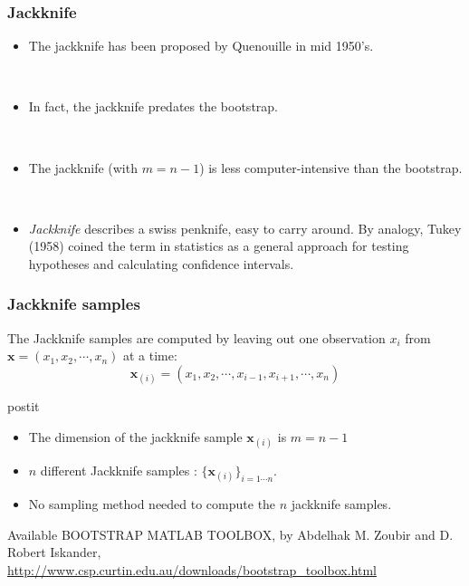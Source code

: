 \frame
{
\frametitle{Jackknife}

\begin{itemize}
\item  The jackknife has been proposed by Quenouille in mid 1950's.

\

\item In fact, the jackknife predates the bootstrap. 

\

\item The jackknife (with $m=n-1$) is less computer-intensive than the bootstrap. 

\

\item \textit{Jackknife} describes a swiss penknife, easy to carry around. By analogy, Tukey (1958) coined the term in statistics as a general approach for testing hypotheses and calculating confidence intervals.  


\end{itemize}

}
\frame
{
\frametitle{Jackknife samples}

\begin{definition}
The \alert{Jackknife samples} are computed by leaving out one observation $x_i$ from $\mathbf{x}=(x_{1},x_{2},\cdots,x_{n})$ at a time:
$$
\mathbf{x}_{(i)}=(x_{1},x_{2},\cdots,x_{i-1},x_{i+1},\cdots,x_{n})
$$ 
\end{definition}

\begin{beamercolorbox}[wd=\linewidth, rounded=true,shadow=true]{postit}
\begin{itemize}
\item The dimension of the jackknife sample $\mathbf{x}_{(i)}$ is $m=n-1$  
\item $n$  different Jackknife samples :  $\lbrace\mathbf{x}_{(i)}\rbrace_{i=1\cdots n}$.
\item No sampling method needed to compute the $n$  jackknife samples.

\end{itemize}
\end{beamercolorbox}
\begin{block}{}
\tiny{Available BOOTSTRAP MATLAB TOOLBOX, by Abdelhak M. Zoubir and D. Robert Iskander, 
\href{http://www.csp.curtin.edu.au/downloads/bootstrap_toolbox.html}{http://www.csp.curtin.edu.au/downloads/bootstrap\_toolbox.html}}
\end{block}
}


